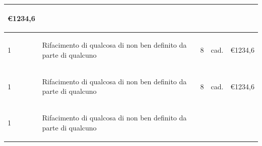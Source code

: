 \documentclass[a4paper]{article}
\begin{document}
\begin{tabular}{ | L{10mm} |  L{86mm} | L{12mm} | L{12mm} | L{16mm} | }
\begin{spacing}{0}
    \euro\hfill 1234,6
  \end{spacing} \\
  \hline
  \vspace{2.5mm}
  \begin{spacing}{0}
    1
  \end{spacing} &
  \vspace{2.5mm}
  \begin{spacing}{0}
    Rifacimento di qualcosa di non ben definito da parte di qualcuno
  \end{spacing} &
  \vspace{2.5mm}
  \begin{spacing}{0}
    8
  \end{spacing} &
  \vspace{2.5mm}
  \begin{spacing}{0}
    cad.
  \end{spacing} &
  \vspace{2.5mm}
  \begin{spacing}{0}
    \euro\hfill 1234,6
  \end{spacing} \\
  \hline
  \vspace{2.5mm}
  \begin{spacing}{0}
    1
  \end{spacing} &
  \vspace{2.5mm}
  \begin{spacing}{0}
    Rifacimento di qualcosa di non ben definito da parte di qualcuno
  \end{spacing} &
  \vspace{2.5mm}
  \begin{spacing}{0}
    8
  \end{spacing} &
  \vspace{2.5mm}
  \begin{spacing}{0}
    cad.
  \end{spacing} &
  \vspace{2.5mm}
  \begin{spacing}{0}
    \euro\hfill 1234,6
  \end{spacing} \\
  \hline
  \vspace{2.5mm}
  \begin{spacing}{0}
    1
  \end{spacing} &
  \vspace{2.5mm}
  \begin{spacing}{0}
    Rifacimento di qualcosa di non ben definito da parte di qualcuno

\end{spacing}
\end{tabular}
\end{document}
